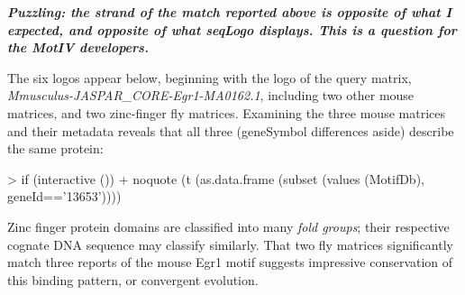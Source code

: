 \documentclass{article}
\renewenvironment{Schunk}{\vspace{\topsep}}{\vspace{\topsep}}
\begin{document}
\vspace{10 mm}

\textbf{\emph{Puzzling: the strand of the match reported above is opposite of what I expected, and opposite of what seqLogo displays.
  This is a question for the MotIV developers.}}

\vspace{10 mm}

The six logos appear below, beginning with the logo of the query matrix, \emph{Mmusculus-JASPAR\_CORE-Egr1-MA0162.1}, including
two other mouse matrices, and two zinc-finger fly matrices.  Examining the three mouse matrices and their metadata reveals that
all three (geneSymbol differences aside) describe the same protein:
\begin{Schunk}
\begin{Sinput}
> if (interactive ())
+   noquote (t (as.data.frame (subset (values (MotifDb), geneId=='13653'))))
\end{Sinput}
\end{Schunk}
Zinc finger protein domains are classified into many \emph{fold groups}; their respective cognate DNA sequence may classify similarly.
That two fly matrices significantly match three reports of the mouse Egr1 motif suggests impressive conservation of this 
binding pattern, or convergent evolution.  
\end{document}

